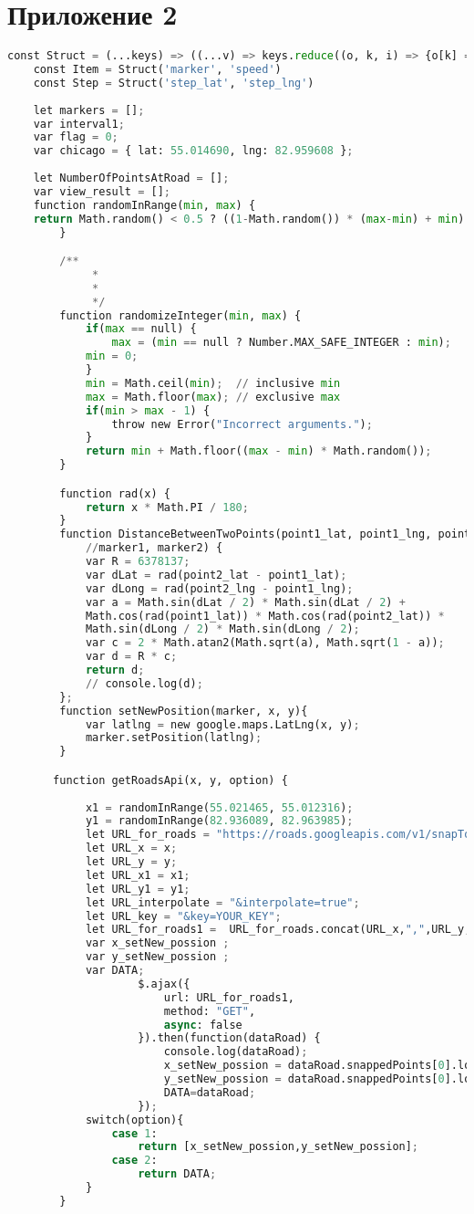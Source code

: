 \documentclass[a4paper]{article}
\begin{document}
\section*{Приложение 2}
\begin{lstlisting}[language=python,tabsize = 1,breaklines=true, breakatwhitespace=false,frame=single]
const Struct = (...keys) => ((...v) => keys.reduce((o, k, i) => {o[k] = v[i]; return o} , {}))
	const Item = Struct('marker', 'speed')
	const Step = Struct('step_lat', 'step_lng')
		
	let markers = [];
	var interval1;
	var flag = 0;
	var chicago = { lat: 55.014690, lng: 82.959608 };
		
	let NumberOfPointsAtRoad = [];
	var view_result = [];
	function randomInRange(min, max) {
	return Math.random() < 0.5 ? ((1-Math.random()) * (max-min) + min) : (Math.random() * (max-min) + min);
		} 

		/**
			 * 
			 * 
			 */
		function randomizeInteger(min, max) {
			if(max == null) {
				max = (min == null ? Number.MAX_SAFE_INTEGER : min);
			min = 0;
			}
			min = Math.ceil(min);  // inclusive min
			max = Math.floor(max); // exclusive max
			if(min > max - 1) {
				throw new Error("Incorrect arguments.");
			}
			return min + Math.floor((max - min) * Math.random());
		}

		function rad(x) {
			return x * Math.PI / 180;
		}
		function DistanceBetweenTwoPoints(point1_lat, point1_lng, point2_lat, point2_lng){
			//marker1, marker2) {
			var R = 6378137;
			var dLat = rad(point2_lat - point1_lat);
			var dLong = rad(point2_lng - point1_lng);
			var a = Math.sin(dLat / 2) * Math.sin(dLat / 2) + 
			Math.cos(rad(point1_lat)) * Math.cos(rad(point2_lat)) *
			Math.sin(dLong / 2) * Math.sin(dLong / 2);
			var c = 2 * Math.atan2(Math.sqrt(a), Math.sqrt(1 - a));
			var d = R * c;
			return d;
			// console.log(d);
		};
		function setNewPosition(marker, x, y){
			var latlng = new google.maps.LatLng(x, y);
			marker.setPosition(latlng);
		}

	   function getRoadsApi(x, y, option) {
		  
			x1 = randomInRange(55.021465, 55.012316);
			y1 = randomInRange(82.936089, 82.963985); 
			let URL_for_roads = "https://roads.googleapis.com/v1/snapToRoads?path=";
			let URL_x = x;
			let URL_y = y;
			let URL_x1 = x1;
			let URL_y1 = y1;
			let URL_interpolate = "&interpolate=true";
			let URL_key = "&key=YOUR_KEY";
			let URL_for_roads1 =  URL_for_roads.concat(URL_x,",",URL_y,"|",URL_x1,",",URL_y1,URL_interpolate,URL_key);
			var x_setNew_possion ;
			var y_setNew_possion ;
			var DATA;
					$.ajax({
						url: URL_for_roads1,
						method: "GET",
						async: false
					}).then(function(dataRoad) {
						console.log(dataRoad);
						x_setNew_possion = dataRoad.snappedPoints[0].location.latitude;
						y_setNew_possion = dataRoad.snappedPoints[0].location.longitude;
						DATA=dataRoad;
					});
			switch(option){
				case 1:
					return [x_setNew_possion,y_setNew_possion];
				case 2:
					return DATA;
			}				
		}


\end{lstlisting}
\end{document}
